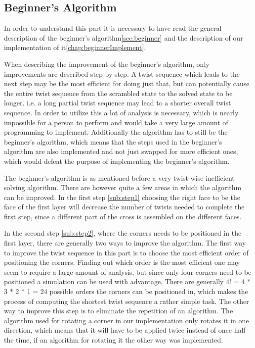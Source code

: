 

\subsection{Beginner's Algorithm}
In order to understand this part it is necessary to have read the general description of the beginner's algorithm\ref{sec:beginner} and the description of our implementation of it\ref{chap:beginnerImplement}. 

When describing the improvement of the beginner's algorithm, only improvements are described step by step. 
A twist sequence which leads to the next step may be the most efficient for doing just that, but can potentially cause the entire twist sequence from the scrambled state to the solved state to be longer. 
i.e. a long partial twist sequence may lead to a shorter overall twist sequence. In order to utilize this a lot of analysis is necessary, which is nearly impossible for a person to perform and would take a very large amount of programming to implement.
Additionally the algorithm has to still be the beginner's algorithm, which means that the steps used in the beginner's algorithm are also implemented and not just swapped for more efficient ones, which would defeat the purpose of implementing the beginner's algorithm.


The beginner's algorithm is as mentioned before a very twist-wise inefficient solving algorithm. 
There are however quite a few areas in which the algorithm can be improved.
In the first step \ref{sub:step1} choosing the right face to be the face of the first layer will decrease the number of twists needed to complete the first step, since a different part of the cross is assembled on the different faces.

In the second step \ref{sub:step2}, where the corners needs to be positioned in the first layer, there are generally two ways to improve the algorithm.
The first way to improve the twist sequence in this part is to choose the most efficient order of positioning the corners.
Finding out which order is the most efficient one may seem to require a large amount of analysis, but since only four corners need to be positioned a simulation can be used with advantage. %
There are generally 4! = 4 * 3 * 2 * 1 = 24 possible orders the corners can be positioned in, which makes the process of computing the shortest twist sequence a rather simple task. %
The other way to improve this step is to eliminate the repetition of an algorithm. The algorithm used for rotating a corner \cpiece{} in our implementation only rotates it in one direction, which means that it will have to be applied twice instead of once half the time, if an algorithm for rotating it the other way was implemented.

